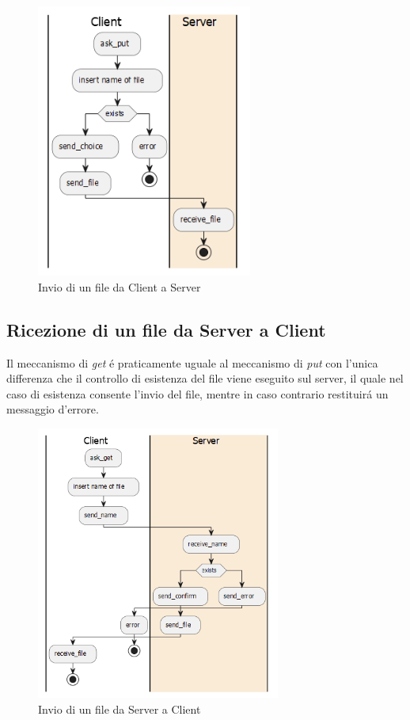 \documentclass[a4paper, 12pt]{report}
\begin{document}
\begin{figure}[H]
    \centering
    \includegraphics[height=9cm]{img/clientToServer.png}
    \caption{Invio di un file da Client a Server}
\end{figure}

\newpage
\subsection{Ricezione di un file da Server a Client}
Il meccanismo di \emph{get} é praticamente uguale al meccanismo di \emph{put} con l'unica differenza
che il controllo di esistenza del file viene eseguito sul server, il quale nel caso di esistenza
consente l'invio del file, mentre in caso contrario restituirá un messaggio d'errore.

\begin{figure}[H]
    \centering
    \includegraphics[height=9cm]{img/serverToClient.png}
    \caption{Invio di un file da Server a Client}
\end{figure}
\end{document}
